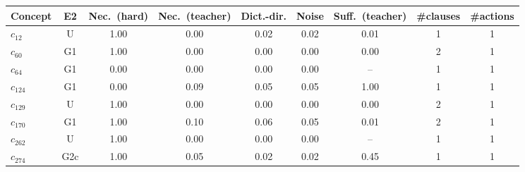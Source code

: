 \begin{tabular}{lcccccccc}
\toprule
Concept & E2 & Nec.\ (hard) & Nec.\ (teacher) & Dict.-dir. & Noise & Suff.\ (teacher) & \#clauses & \#actions \\
\midrule
$c_{12}$ & U & 1.00 & 0.00 & 0.02 & 0.02 & 0.01 & 1 & 1 \\
$c_{60}$ & G1 & 1.00 & 0.00 & 0.00 & 0.00 & 0.00 & 2 & 1 \\
$c_{64}$ & G1 & 0.00 & 0.00 & 0.00 & 0.00 & -- & 1 & 1 \\
$c_{124}$ & G1 & 0.00 & 0.09 & 0.05 & 0.05 & 1.00 & 1 & 1 \\
$c_{129}$ & U & 1.00 & 0.00 & 0.00 & 0.00 & 0.00 & 2 & 1 \\
$c_{170}$ & G1 & 1.00 & 0.10 & 0.06 & 0.05 & 0.01 & 2 & 1 \\
$c_{262}$ & U & 1.00 & 0.00 & 0.00 & 0.00 & -- & 1 & 1 \\
$c_{274}$ & G2c & 1.00 & 0.05 & 0.02 & 0.02 & 0.45 & 1 & 1 \\
\bottomrule
\end{tabular}